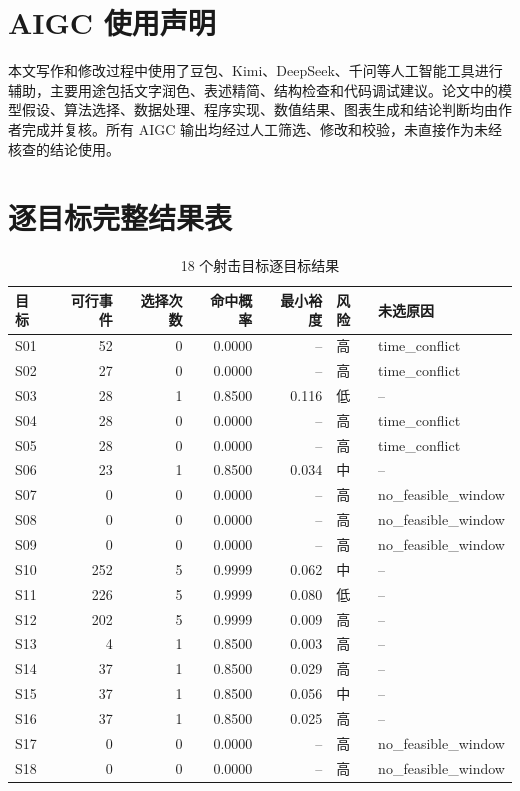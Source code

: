 \documentclass{cumcmthesis}
\begin{document}
\section{AIGC 使用声明}
本文写作和修改过程中使用了豆包、Kimi、DeepSeek、千问等人工智能工具进行辅助，主要用途包括文字润色、表述精简、结构检查和代码调试建议。论文中的模型假设、算法选择、数据处理、程序实现、数值结果、图表生成和结论判断均由作者完成并复核。所有 AIGC 输出均经过人工筛选、修改和校验，未直接作为未经核查的结论使用。

\section{逐目标完整结果表}
\begin{table}[H]
  \centering
  \caption{18 个射击目标逐目标结果}
  \label{tab:shoot_targets}
  \small
  \setlength{\tabcolsep}{4pt}
  \begin{tabular}{lrrrrll}
    \toprule
    目标 & 可行事件 & 选择次数 & 命中概率 & 最小裕度 & 风险 & 未选原因\\
    \midrule
    S01 & 52 & 0 & 0.0000 & -- & 高 & time\_conflict\\
    S02 & 27 & 0 & 0.0000 & -- & 高 & time\_conflict\\
    S03 & 28 & 1 & 0.8500 & 0.116 & 低 & --\\
    S04 & 28 & 0 & 0.0000 & -- & 高 & time\_conflict\\
    S05 & 28 & 0 & 0.0000 & -- & 高 & time\_conflict\\
    S06 & 23 & 1 & 0.8500 & 0.034 & 中 & --\\
    S07 & 0 & 0 & 0.0000 & -- & 高 & no\_feasible\_window\\
    S08 & 0 & 0 & 0.0000 & -- & 高 & no\_feasible\_window\\
    S09 & 0 & 0 & 0.0000 & -- & 高 & no\_feasible\_window\\
    S10 & 252 & 5 & 0.9999 & 0.062 & 中 & --\\
    S11 & 226 & 5 & 0.9999 & 0.080 & 低 & --\\
    S12 & 202 & 5 & 0.9999 & 0.009 & 高 & --\\
    S13 & 4 & 1 & 0.8500 & 0.003 & 高 & --\\
    S14 & 37 & 1 & 0.8500 & 0.029 & 高 & --\\
    S15 & 37 & 1 & 0.8500 & 0.056 & 中 & --\\
    S16 & 37 & 1 & 0.8500 & 0.025 & 高 & --\\
    S17 & 0 & 0 & 0.0000 & -- & 高 & no\_feasible\_window\\
    S18 & 0 & 0 & 0.0000 & -- & 高 & no\_feasible\_window\\
    \bottomrule
  \end{tabular}
\end{table}
\end{document}
